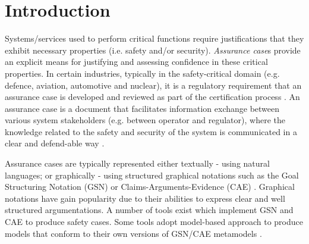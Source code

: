\section{Introduction}
Systems/services used to perform critical functions require justifications that they exhibit necessary properties (i.e. safety and/or security). 
\textit{Assurance case}s provide an explicit means for justifying and assessing confidence in these critical properties. 
In certain industries, typically in the safety-critical domain (e.g. defence, aviation, automotive and nuclear), it is a regulatory requirement that an assurance case is developed and reviewed as part of the certification process \cite{healthFound}.
An assurance case is a document that facilitates information exchange between various system stakeholders (e.g. between operator and regulator), where the knowledge related to the safety and security of the system is communicated in a clear and defend-able way \cite{hawkins2013assurance}. 

Assurance cases are typically represented either textually - using natural languages; or graphically - using structured graphical notations such as the Goal Structuring Notation (GSN) \cite{kelly2004goal} or Claims-Arguments-Evidence (CAE) \cite{bishop2000methodology}. 
Graphical notations have gain popularity due to their abilities to express clear and well structured argumentations.
A number of tools exist which implement GSN \cite{denney2017tool, matsuno2010dependability, netkachova2014tool, larrucea2017supporting, barry2011certware, yorkgsn} and CAE \cite{denney2017tool, barry2011certware} to produce safety cases. 
Some tools adopt model-based approach to produce models that conform to their own versions of GSN/CAE metamodels \cite{barry2011certware, larrucea2017supporting}.


